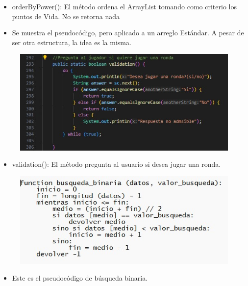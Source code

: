 \documentclass{article}
\begin{document}
	
	\begin{itemize}	
		\item orderByPower(): El método ordena el ArrayList tomando como criterio los puntos de Vida. No se retorna nada
		\item Se muestra el pseudocódigo, pero aplicado a un arreglo Estándar. A pesar de ser otra estructura, la idea es la misma.
	\end{itemize}
	
	\begin{figure}[H]
		\centering
		\includegraphics[width=1\textwidth,keepaspectratio]{img/validation.jpg}
	\end{figure}
	
	\begin{itemize}	
		\item validation(): El método pregunta al usuario si desea jugar una ronda.
	\end{itemize}
	
	\begin{figure}[H]
		\centering
		\includegraphics[width=1\textwidth,keepaspectratio]{img/binary.jpg}
	\end{figure}
	
	
	\begin{itemize}	
		\item Este es el pseudocódigo de búsqueda binaria.
	\end{itemize}
	
\end{document}
